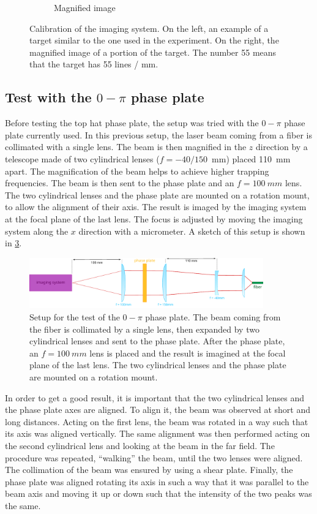 \begin{figure}
\begin{subfigure}[b]{0.6\textwidth}
        \caption{Magnified image}
        \label{fig:magnified}
    \end{subfigure}
    \caption{Calibration of the imaging system. On the left, an example of a target similar to the one used in the experiment. On the right, the magnified image of a portion of the target. The number 55 means that the target has 55 lines / \si{mm}.}
\end{figure}

\subsection{Test with the $0-\pi$ phase plate}
Before testing the top hat phase plate, the setup was tried with the $0-\pi$ phase plate currently used. In this previous setup, the laser beam coming from a fiber is collimated with a single lens. The beam is then magnified in the $z$ direction by a telescope made of two cylindrical lenses ($f=-40/150$~mm) placed \SI{110}{mm} apart. The magnification of the beam helps to achieve higher trapping frequencies. The beam is then sent to the phase plate and an $f=\SI{100}{mm}$ lens. The two cylindrical lenses and the phase plate are mounted on a rotation mount, to allow the alignment of their axis. The result is imaged by the imaging system at the focal plane of the last lens. The focus is adjusted by moving the imaging system along the $x$ direction with a micrometer. A sketch of this setup is shown in \cref{fig:0pi_setup}.

\begin{figure}
    \includegraphics[width=0.9\textwidth]{chapters/chapter_3/figures/0pi_setup.pdf}
    \caption{Setup for the test of the $0-\pi$ phase plate. The beam coming from the fiber is collimated by a single lens, then expanded by two cylindrical lenses and sent to the phase plate. After the phase plate, an $f=\SI{100}{mm}$ lens is placed and the result is imagined at the focal plane of the last lens. The two cylindrical lenses and the phase plate are mounted on a rotation mount.}
    \label{fig:0pi_setup}
\end{figure}

In order to get a good result, it is important that the two cylindrical lenses and the phase plate axes are aligned. To align it, the beam was observed at short and long distances. Acting on the first lens, the beam was rotated in a way such that its axis was aligned vertically. The same alignment was then performed acting on the second cylindrical lens and looking at the beam in the far field. The procedure was repeated, \enquote{walking} the beam, until the two lenses were aligned. The collimation of the beam was ensured by using a shear plate. Finally, the phase plate was aligned rotating its axis in such a way that it was parallel to the beam axis and moving it up or down such that the intensity of the two peaks was the same.

